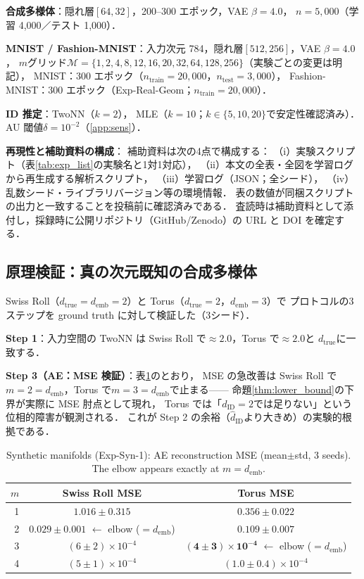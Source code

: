 \documentclass[11pt,a4paper]{jsarticle}
\newcommand{\dID}{d_{\mathrm{ID}}}
\newcommand{\hatdID}{\hat{d}_{\mathrm{ID}}}
\newcommand{\dtrue}{d_{\mathrm{true}}}
\newcommand{\demb}{d_{\mathrm{emb}}}
\begin{document}
\textbf{合成多様体}：隠れ層$[64, 32]$，200--300 エポック，VAE $\beta = 4.0$，
$n = 5{,}000$（学習 4,000／テスト 1,000）．

\textbf{MNIST / Fashion-MNIST}：入力次元 784，隠れ層$[512, 256]$，VAE $\beta = 4.0$，
$m$グリッド$\mathcal{M} = \{1, 2, 4, 8, 12, 16, 20, 32, 64, 128, 256\}$（実験ごとの変更は明記），
MNIST：300 エポック（$n_{\mathrm{train}} = 20{,}000$，$n_{\mathrm{test}} = 3{,}000$），
Fashion-MNIST：300 エポック（Exp-Real-Geom；$n_{\mathrm{train}} = 20{,}000$）．

\textbf{ID 推定}：TwoNN（$k = 2$）\cite{facco2017twonn}，
MLE（$k = 10$；$k \in \{5, 10, 20\}$で安定性確認済み）\cite{levina2005mle}．
AU 閾値$\delta = 10^{-2}$（\ref{app:sens}）．

\textbf{再現性と補助資料の構成}：
補助資料は次の4点で構成する：
（i）実験スクリプト（表\ref{tab:exp_list}の実験名と1対1対応），
（ii）本文の全表・全図を学習ログから再生成する解析スクリプト，
（iii）学習ログ（JSON；全シード），
（iv）乱数シード・ライブラリバージョン等の環境情報．
表の数値が同梱スクリプトの出力と一致することを投稿前に確認済みである．
査読時は補助資料として添付し，採録時に公開リポジトリ（GitHub/Zenodo）の
URL と DOI を確定する．

\subsection{原理検証：真の次元既知の合成多様体}\label{sec:exp_syn}

Swiss Roll（$\dtrue = \demb = 2$）と Torus（$\dtrue = 2$，$\demb = 3$）で
プロトコルの3ステップを ground truth に対して検証した（3シード）．

\textbf{Step 1}：入力空間の TwoNN は Swiss Roll で$\approx 2.0$，Torus で$\approx 2.0$と
$\dtrue$に一致する．

\textbf{Step 3（AE：MSE 検証）}：表\ref{tab:e1}のとおり，
MSE の急改善は Swiss Roll で$m = 2 = \demb$，Torus で$m = 3 = \demb$で止まる——
命題\ref{thm:lower_bound}の下界が実際に MSE 肘点として現れ，
Torus では「$\dID = 2$では足りない」という位相的障害が観測される．
これが Step 2 の余裕（$\hatdID$より大きめ）の実験的根拠である．

\begin{table}[H]
\centering
\caption{Synthetic manifolds (Exp-Syn-1): AE reconstruction MSE
(mean$\pm$std, 3 seeds). The elbow appears exactly at $m = \demb$.}
\label{tab:e1}
\small
\begin{tabular}{rcc}
\toprule
$m$ & Swiss Roll MSE & Torus MSE \\
\midrule
1 & $1.016 \pm 0.315$ & $0.356 \pm 0.022$ \\
2 & $\boldsymbol{0.029 \pm 0.001}$ $\leftarrow$ elbow ($= \demb$) & $0.109 \pm 0.007$ \\
3 & $(6 \pm 2) \times 10^{-4}$ & $\boldsymbol{(4 \pm 3) \times 10^{-4}}$ $\leftarrow$ elbow ($= \demb$) \\
4 & $(5 \pm 1) \times 10^{-4}$ & $(1.0 \pm 0.4) \times 10^{-4}$ \\
\bottomrule
\end{tabular}
\end{table}
\end{document}
